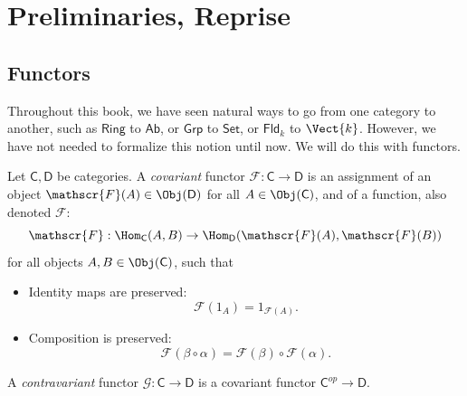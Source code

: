 \section{Preliminaries, Reprise}
\subsection{Functors}
Throughout this book, we have seen natural ways to go from one category to another, such as $\mathsf{Ring} $ to $\mathsf{Ab} $, or $\mathsf{Grp} $ to $\mathsf{Set} $, or $\mathsf{Fld}_k$ to $\Vect{k} $. However, we have not needed to formalize this notion until now. We will do this with functors.
\begin{definition}[Functor]\label{dfn:8.1}
	Let $\mathsf{C} ,\mathsf{D} $ be categories. A \emph{covariant} functor $\mathscr{F} : \mathsf{C}  \to \mathsf{D} $ is an assignment of an object $\mathscr{F} (A)\in \Obj(\mathsf{D} ) $ for all $A\in \Obj(\mathsf{C} ) $, and of a function, also denoted $\mathscr{F} $:
	\[
		\mathscr{F} :\Hom_{\mathsf{C} }(A, B) \to \Hom_{\mathsf{D} }(\mathscr{F} (A), \mathscr{F} (B)) 
	\]
	for all objects $A,B\in \Obj(\mathsf{C} ) $, such that
	\begin{itemize}
		\item Identity maps are preserved:
			\[
				\mathscr{F} (1_A)=1_{\mathscr{F} (A)} 
			.\]
		\item Composition is preserved:
			\[
				\mathscr{F} (\beta \circ \alpha )=\mathscr{F} (\beta )\circ \mathscr{F} (\alpha )
			.\]
			
	\end{itemize}
	
	A \emph{contravariant} functor $\mathscr{G} : \mathsf{C}  \to \mathsf{D} $ is a covariant functor $\mathsf{C} ^{op} \to \mathsf{D} $.
\end{definition}

